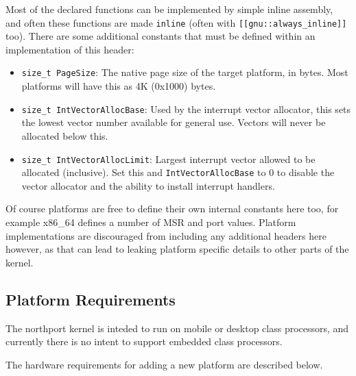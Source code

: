 Most of the declared functions can be implemented by simple inline assembly, and often these functions are made \verb|inline| (often with \verb|[[gnu::always_inline]]| too). There are some additional constants that must be defined within an implementation of this header:

\begin{itemize}
    \item \verb|size_t PageSize|: The native page size of the target platform, in bytes. Most platforms will have this as 4K (0x1000) bytes.
    \item \verb|size_t IntVectorAllocBase|: Used by the interrupt vector allocator, this sets the lowest vector number available for general use. Vectors will never be allocated below this.
    \item \verb|size_t IntVectorAllocLimit|: Largest interrupt vector allowed to be allocated (inclusive). Set this and \verb|IntVectorAllocBase| to 0 to disable the vector allocator and the ability to install interrupt handlers.
\end{itemize}

Of course platforms are free to define their own internal constants here too, for example x86\_64 defines a number of MSR and port values. Platform implementations are discouraged from including any additional headers here however, as that can lead to leaking platform specific details to other parts of the kernel.

\subsection{Platform Requirements}
The northport kernel is inteded to run on mobile or desktop class processors, and currently there is no intent to support embedded class processors.

The hardware requirements for adding a new platform are described below.

